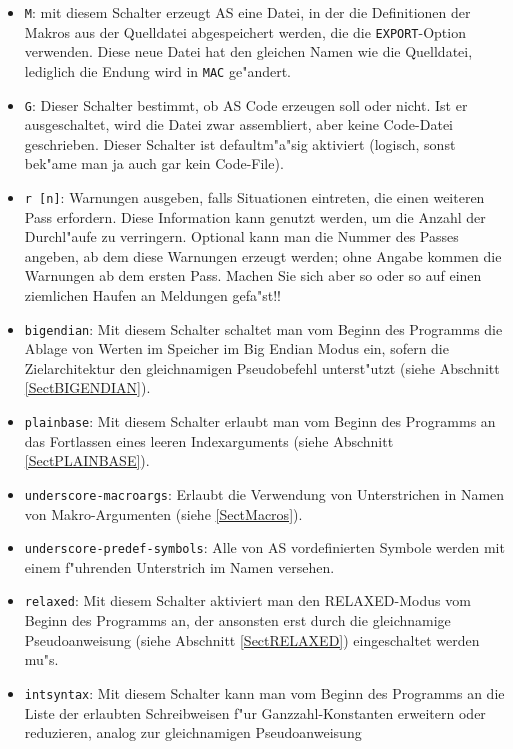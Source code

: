 \documentclass[12pt,a4paper,twoside]{report}
\newcommand{\tty}[1]{{\tt #1}}
\newcommand{\asname}{AS}
\begin{document}
\begin{itemize}
{      der Datei ist \tty{I}.}
\item{\tty{M}: mit diesem Schalter erzeugt \asname{} eine Datei, in der die Definitionen
      der Makros aus der Quelldatei abgespeichert werden, die die
      \tty{EXPORT}-Option verwenden.  Diese neue Datei hat den gleichen
      Namen wie die Quelldatei, lediglich die Endung wird in \tty{MAC} ge"andert.}
\item{\tty{G}: Dieser Schalter bestimmt, ob \asname{} Code erzeugen soll oder nicht.
      Ist er ausgeschaltet, wird die Datei zwar assembliert,
      aber keine Code-Datei geschrieben. Dieser Schalter ist defaultm"a"sig aktiviert
      (logisch, sonst bek"ame man ja auch gar kein Code-File).}
\item{\tty{r [n]}: Warnungen ausgeben, falls Situationen eintreten, die
      einen weiteren Pass erfordern.  Diese Information kann genutzt
      werden, um die Anzahl der Durchl"aufe zu verringern.  Optional kann
      man die Nummer des Passes angeben, ab dem diese Warnungen erzeugt
      werden; ohne Angabe kommen die Warnungen ab dem ersten Pass.  Machen
      Sie sich aber so oder so auf einen ziemlichen Haufen an Meldungen
      gefa"st!!}
\item{\tty{bigendian}: Mit diesem Schalter schaltet man vom Beginn des
      Programms die Ablage von Werten im Speicher im Big Endian Modus ein,
      sofern die Zielarchitektur den gleichnamigen Pseudobefehl unterst"utzt
      (siehe Abschnitt \ref{SectBIGENDIAN}).}
\item{\tty{plainbase}: Mit diesem Schalter erlaubt man vom Beginn des
      Programms an das Fortlassen eines leeren Indexarguments (siehe Abschnitt
      \ref{SectPLAINBASE}).}
\item{\tty{underscore-macroargs}: Erlaubt die Verwendung von Unterstrichen in
      Namen von Makro-Argumenten (siehe \ref{SectMacros}).}
\item{\tty{underscore-predef-symbols}: Alle von \asname{} vordefinierten
      Symbole werden mit einem f"uhrenden Unterstrich im Namen versehen.}
\item{\tty{relaxed}: Mit diesem Schalter aktiviert man den RELAXED-Modus
      vom Beginn des Programms an, der ansonsten erst durch die gleichnamige
      Pseudoanweisung (siehe Abschnitt \ref{SectRELAXED}) eingeschaltet
      werden mu"s.}
\item{\tty{intsyntax}: Mit diesem Schalter kann man vom Beginn des Programms
      an die Liste der erlaubten Schreibweisen f"ur Ganzzahl-Konstanten
      erweitern oder reduzieren, analog zur gleichnamigen Pseudoanweisung
}
\end{itemize}
\end{document}
